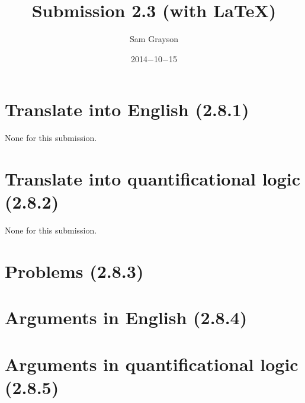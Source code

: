 \documentclass[12pt,letterpaper]{article}
\title{Submission 2.3 (with \LaTeX)}
\date{2014$-$10$-$15}
\author{Sam Grayson}
\begin{document}
\maketitle
\singlespacing

\section{Translate into English (2.8.1)}
None for this submission.
%

\section{Translate into quantificational logic (2.8.2)}
None for this submission.
%

\section{Problems (2.8.3)}
\begin{enumerate}

\end{enumerate}

\section{Arguments in English (2.8.4)}
\begin{enumerate}

\end{enumerate}

\section{Arguments in quantificational logic (2.8.5)}
\begin{enumerate}

\end{enumerate}
\end{document}
